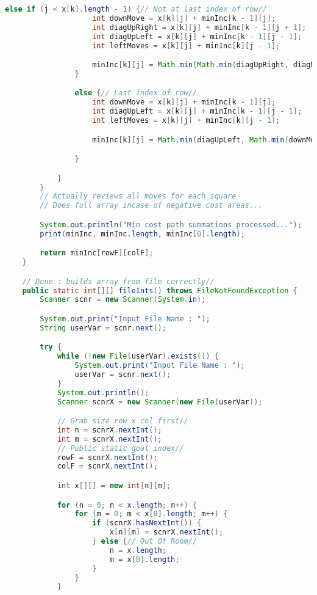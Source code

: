 \documentclass[11pt]{article}
\begin{document}
\begin{lstlisting}[language=Java]
                else if (j < x[k].length - 1) {// Not at last index of row//
                    int downMove = x[k][j] + minInc[k - 1][j];
                    int diagUpRight = x[k][j] + minInc[k - 1][j + 1];
                    int diagUpLeft = x[k][j] + minInc[k - 1][j - 1];
                    int leftMoves = x[k][j] + minInc[k][j - 1];

                    minInc[k][j] = Math.min(Math.min(diagUpRight, diagUpLeft), Math.min(downMove, leftMoves));
                }

                else {// Last index of row//
                    int downMove = x[k][j] + minInc[k - 1][j];
                    int diagUpLeft = x[k][j] + minInc[k - 1][j - 1];
                    int leftMoves = x[k][j] + minInc[k][j - 1];

                    minInc[k][j] = Math.min(diagUpLeft, Math.min(downMove, leftMoves));

                }

            }
        }
        // Actually reviews all moves for each square
        // Does full array incase of negative cost areas...

        System.out.println("Min cost path summations processed...");
        print(minInc, minInc.length, minInc[0].length);

        return minInc[rowF][colF];
    }

    // Done : builds array from file correctly//
    public static int[][] fileInts() throws FileNotFoundException {
        Scanner scnr = new Scanner(System.in);

        System.out.print("Input File Name : ");
        String userVar = scnr.next();

        try {
            while (!new File(userVar).exists()) {
                System.out.print("Input File Name : ");
                userVar = scnr.next();
            }
            System.out.println();
            Scanner scnrX = new Scanner(new File(userVar));

            // Grab size row x col first//
            int n = scnrX.nextInt();
            int m = scnrX.nextInt();
            // Public static goal index//
            rowF = scnrX.nextInt();
            colF = scnrX.nextInt();

            int x[][] = new int[n][m];

            for (n = 0; n < x.length; n++) {
                for (m = 0; m < x[0].length; m++) {
                    if (scnrX.hasNextInt()) {
                        x[n][m] = scnrX.nextInt();
                    } else {// Out Of Room//
                        n = x.length;
                        m = x[0].length;
                    }
                }
            }


\end{lstlisting}
\end{document}

